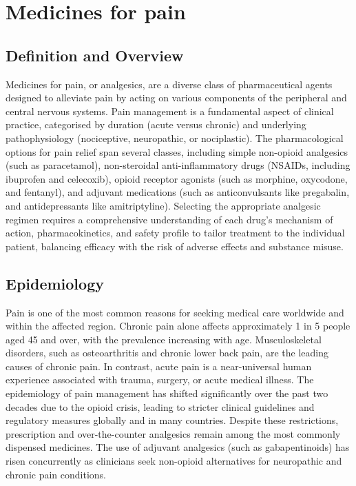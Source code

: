 \chapter{Medicines for pain}

\section*{Definition and Overview}
Medicines for pain, or analgesics, are a diverse class of pharmaceutical agents designed to alleviate pain by acting on various components of the peripheral and central nervous systems. Pain management is a fundamental aspect of clinical practice, categorised by duration (acute versus chronic) and underlying pathophysiology (nociceptive, neuropathic, or nociplastic). The pharmacological options for pain relief span several classes, including simple non-opioid analgesics (such as paracetamol), non-steroidal anti-inflammatory drugs (NSAIDs, including ibuprofen and celecoxib), opioid receptor agonists (such as morphine, oxycodone, and fentanyl), and adjuvant medications (such as anticonvulsants like pregabalin, and antidepressants like amitriptyline). Selecting the appropriate analgesic regimen requires a comprehensive understanding of each drug's mechanism of action, pharmacokinetics, and safety profile to tailor treatment to the individual patient, balancing efficacy with the risk of adverse effects and substance misuse.

\section*{Epidemiology}
Pain is one of the most common reasons for seeking medical care worldwide and within the affected region. Chronic pain alone affects approximately 1 in 5 people aged 45 and over, with the prevalence increasing with age. Musculoskeletal disorders, such as osteoarthritis and chronic lower back pain, are the leading causes of chronic pain. In contrast, acute pain is a near-universal human experience associated with trauma, surgery, or acute medical illness. The epidemiology of pain management has shifted significantly over the past two decades due to the opioid crisis, leading to stricter clinical guidelines and regulatory measures globally and in many countries. Despite these restrictions, prescription and over-the-counter analgesics remain among the most commonly dispensed medicines. The use of adjuvant analgesics (such as gabapentinoids) has risen concurrently as clinicians seek non-opioid alternatives for neuropathic and chronic pain conditions.

